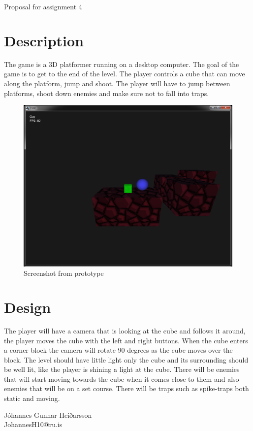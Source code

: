 \documentclass[12pt]{article}
\begin{document}
	\newcommand{\tr}{Tracker\xspace}

	{\huge Proposal for assignment 4\\}
	\section{Description}
		The game is a 3D platformer running on a desktop computer.
		The goal of the game is to get to the end of the level.
		The player controls a cube that can move along the platform, jump and shoot.
		The player will have to jump between platforms, shoot down enemies and make sure not to fall into traps.
		\begin{figure}[h!]
			\includegraphics[scale=0.5]{screenshot}
			\caption{Screenshot from prototype}
		\end{figure}

	\section{Design}
		The player will have a camera that is looking at the cube and follows it around, the player moves the cube with the left and right buttons.
		When the cube enters a corner block the camera will rotate 90 degrees as the cube moves over the block. The level should have little light only the
		cube and its surrounding should be well lit, like the player is shining a light at the cube. 
		There will be enemies that will start moving towards the cube when it comes close to them and also enemies that will be on a set course.
		There will be traps such as spike-traps both static and moving.\\


	
	\vspace{5pt}
	\begin{flushright}
	{\large Jóhannes Gunnar Heiðarsson\\}
	JohannesH10@ru.is
	\end{flushright}
	
\end{document}
